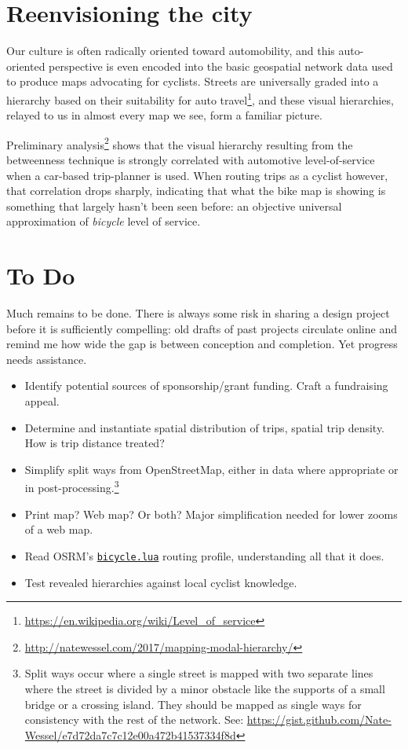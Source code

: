 \documentclass{article}
\begin{document}
	\section*{Reenvisioning the city}
		Our culture is often radically oriented toward automobility, and this  auto-oriented perspective is even encoded into the basic geospatial network data used to produce maps advocating for cyclists. Streets are universally graded into a hierarchy based on their suitability for auto travel\footnote{\href{https://en.wikipedia.org/wiki/Level_of_service}{https://en.wikipedia.org/wiki/Level\_of\_service}}, and these visual hierarchies, relayed to us in almost every map we see, form a familiar picture. 
		
		Preliminary analysis\footnote{
			\href{http://natewessel.com/2017/mapping-modal-hierarchy/}{http://natewessel.com/2017/mapping-modal-hierarchy/}
		} shows that the visual hierarchy resulting from the betweenness technique is strongly correlated with automotive level-of-service when a car-based trip-planner is used. 
		When routing trips as a cyclist however, that correlation drops sharply, indicating that what the bike map is showing is something that largely hasn't been seen before: an objective universal approximation of \textit{bicycle} level of service. 
	
	\section*{To Do}
		Much remains to be done. There is always some risk in sharing a design project before it is sufficiently compelling: old drafts of past projects circulate online and remind me how wide the gap is between conception and completion. Yet progress needs assistance. 
		\begin{itemize}
			\item Identify potential sources of sponsorship/grant funding. Craft a fundraising appeal. 
			\item Determine and instantiate spatial distribution of trips, spatial trip density. How is trip distance treated?
			\item Simplify split ways from OpenStreetMap, either in data where appropriate or in post-processing.\footnote{Split ways occur where a single street is mapped with two separate lines where the street is divided by a minor obstacle like the supports of a small bridge or a crossing island. They should be mapped as single ways for consistency with the rest of the network. See: \href{https://gist.github.com/Nate-Wessel/e7d72da7c7c12e00a472b41537334f8d}{https://gist.github.com/Nate-Wessel/e7d72da7c7c12e00a472b41537334f8d}}
			\item Print map? Web map? Or both? Major simplification needed for lower zooms of a web map.
			\item Read OSRM's \href{https://github.com/Project-OSRM/osrm-backend/blob/82b5648c97edf1d2edec7aecebc35aa8a8033c82/profiles/bicycle.lua}{\texttt{bicycle.lua}} routing profile, understanding all that it does. 
			\item Test revealed hierarchies against local cyclist knowledge. 
		\end{itemize}
	
\end{document}
